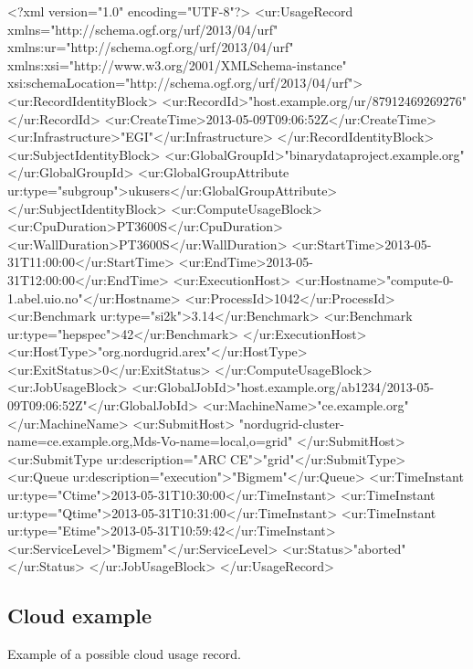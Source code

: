 \begin{XMLexample}
<?xml version="1.0" encoding="UTF-8"?>
<ur:UsageRecord xmlns="http://schema.ogf.org/urf/2013/04/urf"
    xmlns:ur="http://schema.ogf.org/urf/2013/04/urf"
    xmlns:xsi="http://www.w3.org/2001/XMLSchema-instance"
    xsi:schemaLocation="http://schema.ogf.org/urf/2013/04/urf">
    <ur:RecordIdentityBlock>
        <ur:RecordId>"host.example.org/ur/87912469269276"</ur:RecordId>
        <ur:CreateTime>2013-05-09T09:06:52Z</ur:CreateTime>
        <ur:Infrastructure>"EGI"</ur:Infrastructure>
    </ur:RecordIdentityBlock>
    <ur:SubjectIdentityBlock>
        <ur:GlobalGroupId>"binarydataproject.example.org"</ur:GlobalGroupId>
        <ur:GlobalGroupAttribute ur:type="subgroup">ukusers</ur:GlobalGroupAttribute>
    </ur:SubjectIdentityBlock>
    <ur:ComputeUsageBlock>
        <ur:CpuDuration>PT3600S</ur:CpuDuration>
        <ur:WallDuration>PT3600S</ur:WallDuration>
        <ur:StartTime>2013-05-31T11:00:00</ur:StartTime>
        <ur:EndTime>2013-05-31T12:00:00</ur:EndTime>
        <ur:ExecutionHost>
            <ur:Hostname>"compute-0-1.abel.uio.no"</ur:Hostname>
            <ur:ProcessId>1042</ur:ProcessId>
            <ur:Benchmark ur:type="si2k">3.14</ur:Benchmark>
            <ur:Benchmark ur:type="hepspec">42</ur:Benchmark>
        </ur:ExecutionHost>
        <ur:HostType>"org.nordugrid.arex"</ur:HostType>
        <ur:ExitStatus>0</ur:ExitStatus>
    </ur:ComputeUsageBlock>
    <ur:JobUsageBlock>
        <ur:GlobalJobId>"host.example.org/ab1234/2013-05-09T09:06:52Z"</ur:GlobalJobId>
        <ur:MachineName>"ce.example.org"</ur:MachineName>
        <ur:SubmitHost>
            "nordugrid-cluster-name=ce.example.org,Mds-Vo-name=local,o=grid"
        </ur:SubmitHost>
        <ur:SubmitType ur:description="ARC CE">"grid"</ur:SubmitType>
        <ur:Queue ur:description="execution">"Bigmem"</ur:Queue>
        <ur:TimeInstant ur:type="Ctime">2013-05-31T10:30:00</ur:TimeInstant>
        <ur:TimeInstant ur:type="Qtime">2013-05-31T10:31:00</ur:TimeInstant>
        <ur:TimeInstant ur:type="Etime">2013-05-31T10:59:42</ur:TimeInstant>
        <ur:ServiceLevel>"Bigmem"</ur:ServiceLevel>
        <ur:Status>"aborted"</ur:Status>
    </ur:JobUsageBlock>
</ur:UsageRecord>
\end{XMLexample}

\subsection{Cloud example}
Example of a possible cloud usage record.

